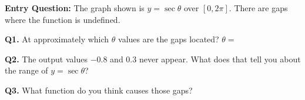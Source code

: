\documentclass[10pt]{article}
\begin{document}
\begin{hookbox}
\textbf{Entry Question:} The graph shown is $y = \sec\theta$ over $[0, 2\pi]$.
There are gaps where the function is undefined.

\vspace{4pt}
\textbf{Q1.} At approximately which $\theta$ values are the gaps located?
$\theta = $ \underline{\hspace{2.5cm}}

\vspace{4pt}
\textbf{Q2.} The output values $-0.8$ and $0.3$ never appear. What does that tell
you about the range of $y = \sec\theta$?
\writeline

\vspace{4pt}
\textbf{Q3.} What function do you think causes those gaps?
\writeline
\end{hookbox}

\vspace{0.08in}
\end{document}
